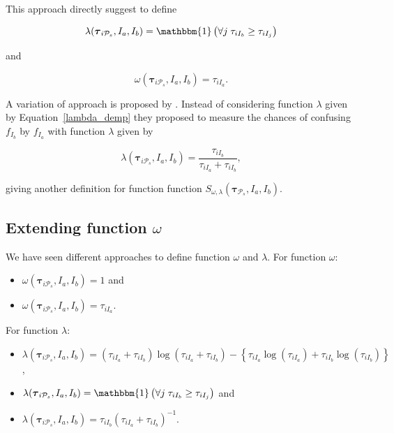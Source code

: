 \documentclass[10pt, a4paper]{article}
\newcommand{\m}[1]{\boldsymbol{#1}}
\begin{document}
\begin{spacing}{1.9}
This approach directly suggest to define

\begin{equation}\label{lambda_demp}
\lambda(\m\tau_{i \mathcal{P}_s},  I_a,  I_b) = \mathbbm{1}\left( \forall j\; \tau_{i I_{b}} \geq \tau_{iI_j} \right)
\end{equation}

and

\[
\omega(\m\tau_{i \mathcal{P}_s},  I_a,  I_b) =  \tau_{iI_a}.
\]

A variation of \cite{hennig2010methods} approach is proposed by \cite{longford2014}. Instead of considering function $\lambda$ given by Equation~\ref{lambda_demp} they proposed to measure the chances of confusing $f_{I_b}$ by $f_{I_a}$ with function $\lambda$ given by

\[
\lambda(\m\tau_{i \mathcal{P}_s},  I_a,  I_b) = \frac{\tau_{iI_b}}{\tau_{iI_a} + \tau_{iI_b}},
\]

giving another definition for function function $S_{\omega, \lambda}( \m\tau_{\mathcal{P}_s},  I_a,  I_b)$.


\subsection{Extending function $\omega$}

We have seen different approaches to define function $\omega$ and $\lambda$. For function $\omega$:

\begin{itemize}
\item $\omega(\m\tau_{i \mathcal{P}_s},  I_a,  I_b) = 1$ and
\item $\omega(\m\tau_{i \mathcal{P}_s},  I_a,  I_b) = \tau_{iI_a}$.
\end{itemize}

For function $\lambda$:

\begin{itemize}
\item $\lambda(\m\tau_{i \mathcal{P}_s},  I_a,  I_b) =  (\tau_{iI_a}+\tau_{iI_b}) \log(\tau_{iI_a} + \tau_{iI_b}) - \left\{ \tau_{iI_a} \log(\tau_{iI_a}) + \tau_{iI_b} \log(\tau_{iI_b}) \right\}$,
\item $\lambda(\m\tau_{i \mathcal{P}_s},  I_a,  I_b) = \mathbbm{1}\left( \forall j\; \tau_{i I_{b}} \geq \tau_{iI_j} \right)$ and
\item $\lambda(\m\tau_{i \mathcal{P}_s},  I_a,  I_b) = \tau_{iI_b} (\tau_{iI_a} + \tau_{iI_b})^{-1}$.
\end{itemize}


\end{spacing}
\end{document}
